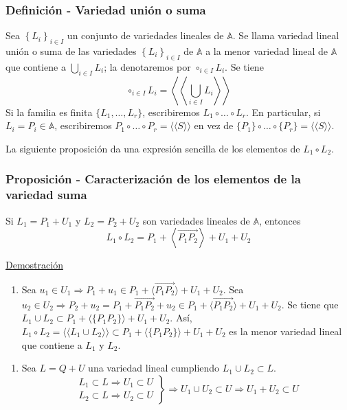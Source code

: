 \documentclass[12pt, a4paper, ones, notitlepage, openany,titlepage]{article}
\begin{document}
\subsubsection{Definición - Variedad unión o suma}
Sea $\left\{L_{i}\right\}_{i \in I}$ un conjunto de variedades lineales de $\mathbb{A}$. Se llama variedad lineal unión o suma de las variedades $\left\{L_{i}\right\}_{i \in I}$ de $\mathbb{A}$ a la menor variedad lineal de $\mathbb{A}$ que contiene a $\displaystyle \bigcup_{i \in I} L_{i}$; la denotaremos por $\circ_{i \in I} L_{i}$. Se tiene
$$
\circ_{i \in I} L_{i}=\left\langle\left\langle\bigcup_{i \in I} L_{i}\right\rangle\right\rangle
$$
Si la familia es finita $\{L_1,\ldots,L_r\}$, escribiremos $L_1 \circ \ldots \circ L_r$. En particular, si $L_i=P_i \in \mathbb{A}$, escribiremos $P_{1} \circ \ldots \circ P_{r}=\langle\langle S\rangle\rangle$ en vez de $\{P_1\} \circ \ldots \circ \{P_r\} = \langle\langle S\rangle\rangle$.

\noindent La siguiente proposición da una expresión sencilla de los elementos de $L_{1} \circ L_{2}$.

\subsubsection{Proposición - Caracterización de los elementos de la variedad suma}
Si $L_{1}=P_{1}+U_{1}$ y $L_{2}=P_{2}+U_{2}$ son variedades lineales de $\mathbb{A}$, entonces
$$
L_{1} \circ L_{2}=P_{1}+\left\langle\overrightarrow{P_{1} P_{2}}\right\rangle+U_{1}+U_{2}
$$

\noindent\underline{Demostración}

\begin{enumerate}[label=$\subset/$]
	\item Sea $u_1 \in U_1 \Longrightarrow P_1 + u_1 \in P_1 + \langle \overrightarrow{P_1 P_2} \rangle + U_1 + U_2$. Sea $u_2 \in U_2 \Longrightarrow P_2 + u_2 = P_1 + \overrightarrow{P_1 P_2} + u_2 \in P_1 + \langle \overrightarrow{P_1 P_2} \rangle + U_1 + U_2$. Se tiene que $L_1 \cup L_2 \subset P_1 + \langle \{P_1 P_2\} \rangle + U_1 + U_2$. Así, $L_1 \circ L_2 = \langle\langle L_1 \cup L_2 \rangle\rangle \subset P_1 + \langle \{P_1 P_2\} \rangle + U_1 + U_2$ es la menor variedad lineal que contiene a $L_1$ y $L_2$.
\end{enumerate}
\begin{enumerate}[label=$\supset/$]
	\item Sea $L = Q + U$ una variedad lineal cumpliendo $L_1 \cup L_2 \subset L$.
	$$
	\left. \begin{array}{r}
		L_1 \subset L \Longrightarrow U_1 \subset U \\
		L_2 \subset L \Longrightarrow U_2 \subset U
	\end{array} \right\} \Longrightarrow U_1 \cup U_2 \subset U \Longrightarrow U_1 + U_2 \subset U
	$$
\end{enumerate}
\end{document}

